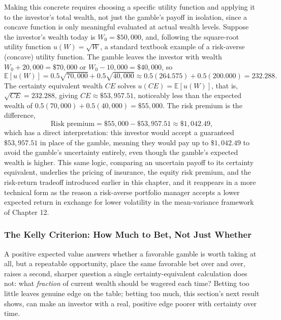 \documentclass[../ai_in_finance]{subfiles}
\begin{document}
Making this concrete requires choosing a specific utility function and applying it to the investor's total wealth, not just the gamble's payoff in isolation, since a concave function is only meaningful evaluated at actual wealth levels. Suppose the investor's wealth today is $W_0 = \$50{,}000$, and, following the square-root utility function $u(W) = \sqrt{W}$, a standard textbook example of a risk-averse (concave) utility function. The gamble leaves the investor with wealth $W_0 + 20{,}000 = \$70{,}000$ or $W_0 - 10{,}000 = \$40{,}000$, so
\begin{equation*}
\mathbb{E}[u(W)] = 0.5\sqrt{70{,}000} + 0.5\sqrt{40{,}000} \approx 0.5(264.575) + 0.5(200.000) = 232.288.
\end{equation*}
The certainty equivalent wealth $CE$ solves $u(CE) = \mathbb{E}[u(W)]$, that is, $\sqrt{CE} = 232.288$, giving $CE \approx \$53{,}957.51$, noticeably less than the expected wealth of $0.5(70{,}000) + 0.5(40{,}000) = \$55{,}000$. The risk premium is the difference,
\begin{equation*}
\text{Risk premium} = \$55{,}000 - \$53{,}957.51 \approx \$1{,}042.49,
\end{equation*}
which has a direct interpretation: this investor would accept a guaranteed $\$53{,}957.51$ in place of the gamble, meaning they would pay up to $\$1{,}042.49$ to avoid the gamble's uncertainty entirely, even though the gamble's expected wealth is higher. This same logic, comparing an uncertain payoff to its certainty equivalent, underlies the pricing of insurance, the equity risk premium, and the risk-return tradeoff introduced earlier in this chapter, and it reappears in a more technical form as the reason a risk-averse portfolio manager accepts a lower expected return in exchange for lower volatility in the mean-variance framework of Chapter 12.

\subsubsection*{The Kelly Criterion: How Much to Bet, Not Just Whether}

A positive expected value answers whether a favorable gamble is worth taking at all, but a repeatable opportunity, place the same favorable bet over and over, raises a second, sharper question a single certainty-equivalent calculation does not: what \emph{fraction} of current wealth should be wagered each time? Betting too little leaves genuine edge on the table; betting too much, this section's next result shows, can make an investor with a real, positive edge poorer with certainty over time.
\end{document}
